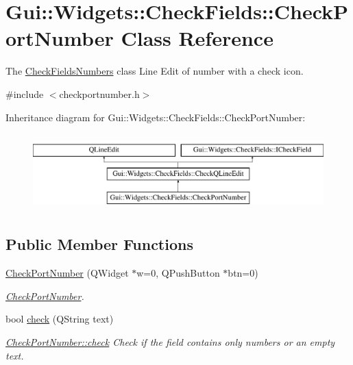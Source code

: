 \hypertarget{classGui_1_1Widgets_1_1CheckFields_1_1CheckPortNumber}{\section{Gui\-:\-:Widgets\-:\-:Check\-Fields\-:\-:Check\-Port\-Number Class Reference}
\label{classGui_1_1Widgets_1_1CheckFields_1_1CheckPortNumber}
}


The \hyperlink{classGui_1_1Widgets_1_1CheckFields_1_1CheckFieldsNumbers}{Check\-Fields\-Numbers} class Line Edit of number with a check icon.  




{\ttfamily \#include $<$checkportnumber.\-h$>$}

Inheritance diagram for Gui\-:\-:Widgets\-:\-:Check\-Fields\-:\-:Check\-Port\-Number\-:\begin{figure}[H]
\begin{center}
\leavevmode
\includegraphics[height=3.000000cm]{d5/d41/classGui_1_1Widgets_1_1CheckFields_1_1CheckPortNumber}
\end{center}
\end{figure}
\subsection*{Public Member Functions}
\begin{DoxyCompactItemize}
\item 
\hyperlink{classGui_1_1Widgets_1_1CheckFields_1_1CheckPortNumber_a587504802ee5cdc0529c411b45d50ee9}{Check\-Port\-Number} (Q\-Widget $\ast$w=0, Q\-Push\-Button $\ast$btn=0)
\begin{DoxyCompactList}\small\item\em \hyperlink{classGui_1_1Widgets_1_1CheckFields_1_1CheckPortNumber}{Check\-Port\-Number}. \end{DoxyCompactList}\item 
bool \hyperlink{classGui_1_1Widgets_1_1CheckFields_1_1CheckPortNumber_aca2bfa31e06451c77a7a38020c2819b7}{check} (Q\-String text)
\begin{DoxyCompactList}\small\item\em \hyperlink{classGui_1_1Widgets_1_1CheckFields_1_1CheckPortNumber_aca2bfa31e06451c77a7a38020c2819b7}{Check\-Port\-Number\-::check} Check if the field contains only numbers or an empty text. \end{DoxyCompactList}\end{DoxyCompactItemize}
